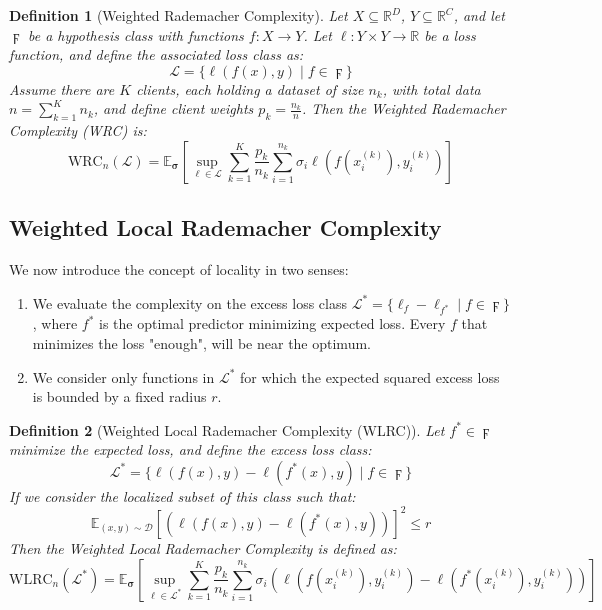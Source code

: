 \documentclass{article}
\newtheorem{definition}{Definition}
\begin{document}
\begin{definition}[Weighted Rademacher Complexity]
Let \( X \subseteq \mathbb{R}^D \), \( Y \subseteq \mathbb{R}^C \), and let \( \digamma \) be a hypothesis class with functions \( f: X \to Y \). Let \( \ell: Y \times Y \to \mathbb{R} \) be a loss function, and define the associated loss class as:
\[
\mathcal{L} = \{ \ell(f(x), y) \mid f \in \digamma \}
\]
Assume there are \( K \) clients, each holding a dataset of size \( n_k \), with total data \( n = \sum_{k=1}^K n_k \), and define client weights \( p_k = \frac{n_k}{n} \). Then the \emph{Weighted Rademacher Complexity (WRC)} is:
\[
\text{WRC}_n(\mathcal{L}) = \mathbb{E}_{\boldsymbol{\sigma}} \left[ \sup_{\ell \in \mathcal{L}} \sum_{k=1}^{K} \frac{p_k}{n_k} \sum_{i=1}^{n_k} \sigma_i \ell(f(x_i^{(k)}), y_i^{(k)}) \right]
\]

\end{definition}

\subsection{Weighted Local Rademacher Complexity}

We now introduce the concept of locality in two senses:
\begin{enumerate}
    \item We evaluate the complexity on the excess loss class \( \mathcal{L}^* = \{ \ell_f - \ell_{f^*} \mid f \in \digamma \} \), where \( f^* \) is the optimal predictor minimizing expected loss. Every $f$ that minimizes the loss "enough", will be near the optimum.
    \item We consider only functions in \( \mathcal{L}^* \) for which the expected squared excess loss is bounded by a fixed radius \( r \).
\end{enumerate}

\begin{definition}[Weighted Local Rademacher Complexity (WLRC)]
Let \( f^* \in \digamma \) minimize the expected loss, and define the excess loss class:
\[
\mathcal{L}^* = \{ \ell(f(x), y) - \ell(f^*(x), y) \mid f \in \digamma \}
\]
If we consider the localized subset of this class such that:
\[
\mathbb{E}_{(x, y) \sim \mathcal{D}}[(\ell(f(x), y) - \ell(f^*(x), y))]^2 \leq r
\]
Then the Weighted Local Rademacher Complexity is defined as:
\[
\text{WLRC}_n(\mathcal{L}^*) = \mathbb{E}_{\boldsymbol{\sigma}} \left[ \sup_{\ell \in \mathcal{L}^*} \sum_{k=1}^{K} \frac{p_k}{n_k} \sum_{i=1}^{n_k} \sigma_i \left( \ell(f(x_i^{(k)}), y_i^{(k)}) - \ell(f^*(x_i^{(k)}), y_i^{(k)}) \right) \right]
\]
\end{definition}
\end{document}
